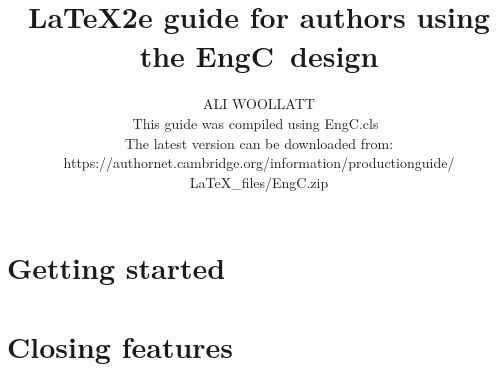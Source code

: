 \documentclass{EngC}
\newcommand\cambridge{EngC}
\theoremstyle{plain}%
\theoremstyle{definition}
\theoremstyle{remark}
\begin{document}
  \title[Subtitle, if you have one]
    {LaTeX2e guide for authors using the \cambridge\ design}

  \author{ALI WOOLLATT\\[3\baselineskip]
    This guide was compiled using \hbox{\cambridge.cls \version}\\[\baselineskip]
    The latest version can be downloaded from:
    https://authornet.cambridge.org/information/productionguide/
      LaTeX\_files/\cambridge.zip}

  \frontmatter
  \maketitle
  \tableofcontents
  \listoffigures
  \listoftables
  \listoffloatingboxes
  \listofcontributors
  

  \mainmatter
  \part{Getting started}

  \part{Closing features}

  \backmatter
  \appendix
  
  
  
  \endappendix

  \theendnotes


  \label{refs}

  \cleardoublepage




\end{document}
